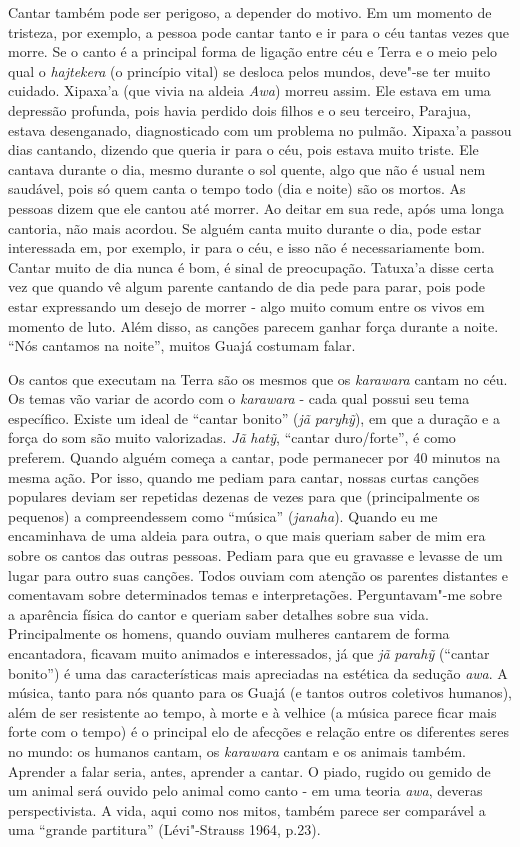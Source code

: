 Cantar também pode ser perigoso, a depender do motivo. Em um momento de
tristeza, por exemplo, a pessoa pode cantar tanto e ir para o céu tantas
vezes que morre. Se o canto é a principal forma de ligação entre céu e
Terra e o meio pelo qual o \emph{hajtekera} (o princípio vital) se
desloca pelos mundos, deve"-se ter muito cuidado. Xipaxa'a (que vivia na
aldeia \emph{Awa}) morreu assim. Ele estava em uma depressão profunda,
pois havia perdido dois filhos e o seu terceiro, Parajua, estava
desenganado, diagnosticado com um problema no pulmão. Xipaxa'a passou
dias cantando, dizendo que queria ir para o céu, pois estava muito
triste. Ele cantava durante o dia, mesmo durante o sol quente, algo que
não é usual nem saudável, pois só quem canta o tempo todo (dia e noite)
são os mortos. As pessoas dizem que ele cantou até morrer. Ao deitar em
sua rede, após uma longa cantoria, não mais acordou. Se alguém canta
muito durante o dia, pode estar interessada em, por exemplo, ir para o
céu, e isso não é necessariamente bom. Cantar muito de dia nunca é bom,
é sinal de preocupação. Tatuxa'a disse certa vez que quando vê algum
parente cantando de dia pede para parar, pois pode estar expressando um
desejo de morrer - algo muito comum entre os vivos em momento de luto.
Além disso, as canções parecem ganhar força durante a noite. ``Nós
cantamos na noite'', muitos Guajá costumam falar.

Os cantos que executam na Terra são os mesmos que os \emph{karawara}
cantam no céu. Os temas vão variar de acordo com o \emph{karawara} -
cada qual possui seu tema específico. Existe um ideal de ``cantar bonito''
(\emph{jã} \emph{paryhỹ}), em que a duração e a força do som são muito
valorizadas. \emph{Jã} \emph{hatỹ}, ``cantar duro/forte'', é como
preferem. Quando alguém começa a cantar, pode permanecer por 40 minutos
na mesma ação. Por isso, quando me pediam para cantar, nossas curtas
canções populares deviam ser repetidas dezenas de vezes para que
(principalmente os pequenos) a compreendessem como ``música''
(\emph{janaha}). Quando eu me encaminhava de uma aldeia para outra, o
que mais queriam saber de mim era sobre os cantos das outras pessoas.
Pediam para que eu gravasse e levasse de um lugar para outro suas
canções. Todos ouviam com atenção os parentes distantes e comentavam
sobre determinados temas e interpretações. Perguntavam"-me sobre a
aparência física do cantor e queriam saber detalhes sobre sua vida.
Principalmente os homens, quando ouviam mulheres cantarem de forma
encantadora, ficavam muito animados e interessados, já que \emph{jã}
\emph{parahỹ} (``cantar bonito'') é uma das características mais
apreciadas na estética da sedução \emph{awa}. A música, tanto para nós
quanto para os Guajá (e tantos outros coletivos humanos), além de ser
resistente ao tempo, à morte e à velhice (a música parece ficar mais
forte com o tempo) é o principal elo de afecções e relação entre os
diferentes seres no mundo: os humanos cantam, os \emph{karawara} cantam
e os animais também. Aprender a falar seria, antes, aprender a cantar. O
piado, rugido ou gemido de um animal será ouvido pelo animal como canto
- em uma teoria \emph{awa}, deveras perspectivista. A vida, aqui como
nos mitos, também parece ser comparável a uma ``grande partitura''
(Lévi"-Strauss 1964, p.23).

